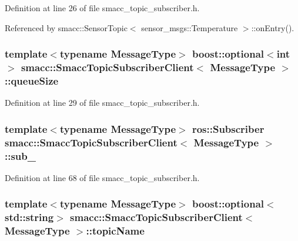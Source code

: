 Definition at line 26 of file smacc\+\_\+topic\+\_\+subscriber.\+h.



Referenced by smacc\+::\+Sensor\+Topic$<$ sensor\+\_\+msgs\+::\+Temperature $>$\+::on\+Entry().

\subsubsection[{\texorpdfstring{queue\+Size}{queueSize}}]{\setlength{\rightskip}{0pt plus 5cm}template$<$typename Message\+Type$>$ boost\+::optional$<${\bf int}$>$ {\bf smacc\+::\+Smacc\+Topic\+Subscriber\+Client}$<$ Message\+Type $>$\+::queue\+Size}\hypertarget{classsmacc_1_1SmaccTopicSubscriberClient_a1fd2ebc705ae0217ae21b23b7098cd9b}{}\label{classsmacc_1_1SmaccTopicSubscriberClient_a1fd2ebc705ae0217ae21b23b7098cd9b}


Definition at line 29 of file smacc\+\_\+topic\+\_\+subscriber.\+h.

\subsubsection[{\texorpdfstring{sub\+\_\+}{sub_}}]{\setlength{\rightskip}{0pt plus 5cm}template$<$typename Message\+Type$>$ ros\+::\+Subscriber {\bf smacc\+::\+Smacc\+Topic\+Subscriber\+Client}$<$ Message\+Type $>$\+::sub\+\_\+\hspace{0.3cm}{\ttfamily [private]}}\hypertarget{classsmacc_1_1SmaccTopicSubscriberClient_aeb481004e428a5d989f39c77321427b6}{}\label{classsmacc_1_1SmaccTopicSubscriberClient_aeb481004e428a5d989f39c77321427b6}


Definition at line 68 of file smacc\+\_\+topic\+\_\+subscriber.\+h.

\subsubsection[{\texorpdfstring{topic\+Name}{topicName}}]{\setlength{\rightskip}{0pt plus 5cm}template$<$typename Message\+Type$>$ boost\+::optional$<$std\+::string$>$ {\bf smacc\+::\+Smacc\+Topic\+Subscriber\+Client}$<$ Message\+Type $>$\+::topic\+Name}\hypertarget{classsmacc_1_1SmaccTopicSubscriberClient_aa7729f37ea89e5d7ab50c81e84638f60}{}\label{classsmacc_1_1SmaccTopicSubscriberClient_aa7729f37ea89e5d7ab50c81e84638f60}



